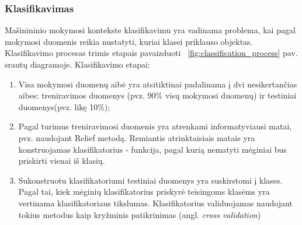\subsubsection{Klasifikavimas}

Mašinininio mokymosi kontekste klasifikavimu yra vadinama problema, kai pagal mokymosi duomenis reikia nustatyti, kuriai klasei priklauso objektas. Klasifikavimo procesas trimis etapais pavaizduoti ~\ref{fig:classification_process} pav. srautų diagramoje. Klasifikavimo etapai:
\begin{enumerate}
 \item Visa mokymosi duomenų aibė yra atsitiktinai padalinama į dvi nesikertančias aibes: treniravimos duomenys (pvz. 90\% visų mokymosi duomenų) ir testiniai duomenys(pvz. likę 10\%);
 \item Pagal turimus treniravimosi duomenis yra atrenkami informatyviausi matai, pvz. naudojant Relief metodą. Remiantis atrinktaisiais matais yra konstruojamas klasifikatorius - funkcija, pagal kurią nematyti mėginiai bus priskirti vienai iš klasių.
 \item Sukonstruotu klasifikatoriumi testiniai duomenys yra suskirstomi į klases. Pagal tai, kiek mėginių klasifikatorius priskyrė teisingoms klasėms yra vertinama klasifikatoriaus tikslumas. Klasifikatorius validuojamas naudojant tokius metodus kaip kryžminis patikrinimas (angl. \textit{cross validation})
\end{enumerate}


